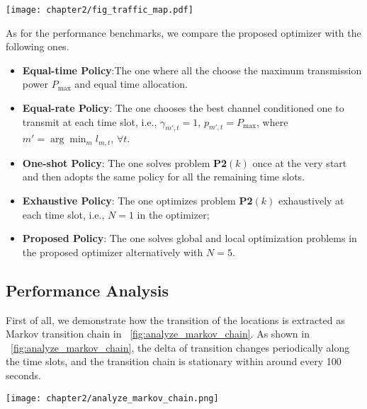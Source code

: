 \begin{figure*}
    \centering
    \texttt{[image: chapter2/fig\_traffic\_map.pdf]}
    \caption{The illustration of {\IAV} paths and BS locations on the road map.}
    \label{fig:traffic_map}
\end{figure*}

As for the performance benchmarks, we compare the proposed {\fwName} optimizer with the following ones.
\begin{itemize}
    \item \textbf{Equal-time Policy}:The one where all the {\IAVs} choose the maximum transmission power $P_{\max}$ and equal time allocation.
    \item \textbf{Equal-rate Policy}: {The one chooses the best channel conditioned one to transmit at each time slot, i.e., $\gamma_{m',t}=1$, $p_{m',t} = P_{\max}$, where $m' = \arg\min_{m} l_{m,t}$, $\forall t$.}
    \item \textbf{One-shot Policy}: The one solves problem \textbf{P2$(k)$} once at the very start and then adopts the same policy for all the remaining time slots.
    \item \textbf{Exhaustive Policy}: The one optimizes problem \textbf{P2$(k)$} exhaustively at each time slot, i.e., $N=1$ in the {\fwName} optimizer;
    \item \textbf{Proposed Policy}: The one solves global and local optimization problems in the proposed {\fwName} optimizer alternatively with $N=5$.
\end{itemize}

\subsection{Performance Analysis}
\label{subsec:chapter2-performance}
First of all, we demonstrate how the transition of the {\IAV} locations is extracted as Markov transition chain in \figurename~\ref{fig:analyze_markov_chain}.
As shown in \figurename~\ref{fig:analyze_markov_chain}, the delta of transition changes periodically along the time slots, and the transition chain is stationary within around every 100 seconds.
\begin{figure*}
    \centering
    \texttt{[image: chapter2/analyze\_markov\_chain.png]}
    \caption{The stationary Markov transition chain of the {\IAV} locations.}
    \label{fig:analyze_markov_chain}
\end{figure*}

